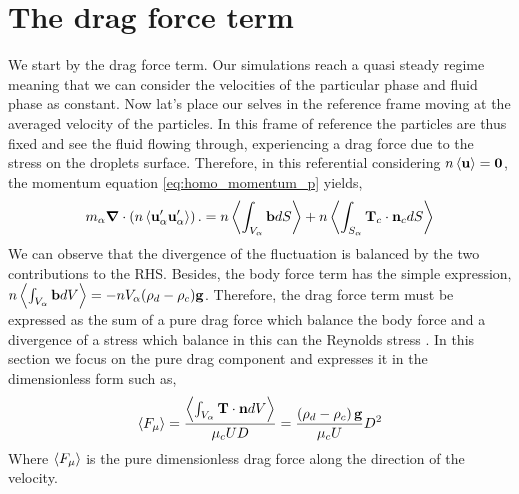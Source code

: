 \section{The drag force term}
We start by the drag force term. 
Our simulations reach a quasi steady regime meaning that we can consider the velocities of the particular phase and fluid phase as constant.
Now lat's place our selves in the reference frame moving at the averaged velocity of the particles. 
In this frame of reference the particles are thus fixed and see the fluid flowing through, experiencing a drag force due to the stress on the droplets surface. 
Therefore, in this referential considering $n \left<\textbf{u}\right> = \textbf{0}$, the momentum equation \ref{eq:homo_momentum_p} yields, 
\begin{equation*}
    m_\alpha \bm{\nabla} \cdot \left(n \left<\textbf{u}_\alpha' \textbf{u}_\alpha'\right>\right). 
    = n \left<\int_{V_\alpha} \textbf{b} dS\right>
    + n \left<\int_{S_\alpha} \textbf{T}_c  \cdot \textbf{n}_c dS\right>
\end{equation*}
We can observe that the divergence of the fluctuation is balanced by the two contributions to the RHS.  
Besides, the body force term has the simple expression, $n \left<\int_{V_\alpha} \textbf{b} dV\right> = - nV_\alpha (\rho_d-\rho_c) \textbf{g}$. 
Therefore, the drag force term must be expressed as the sum of a pure drag force which balance the body force and a divergence of a stress which balance in this can the Reynolds stress \citep{zhang2021ensemble,wang2021numerical,nott2011suspension}. 
In this section we focus on the pure drag component and expresses it in the dimensionless form such as, 
\begin{align*}
    \left<F_\mu\right>
    = \frac
    {\left<\int_{V_\alpha} \textbf{T}\cdot \textbf{n}dV\right>}
    {\mu_c U D}
    = \frac
    {\left(\rho_d -\rho_c\right) \textbf{g}}
    {\mu_c U}D^2
\end{align*}
Where $\left<F_\mu\right>$ is the pure dimensionless drag force along the direction of the velocity. 

